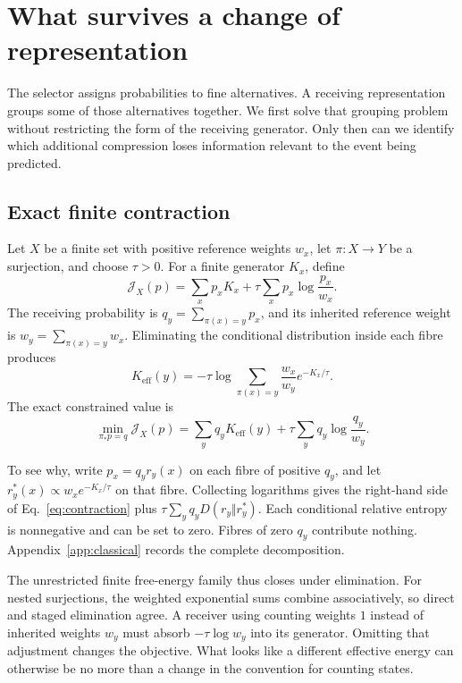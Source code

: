 \section{What survives a change of representation}
\label{sec:yba-examples}

The selector assigns probabilities to fine alternatives. A receiving representation groups some of those alternatives together. We first solve that grouping problem without restricting the form of the receiving generator. Only then can we identify which additional compression loses information relevant to the event being predicted.

\subsection{Exact finite contraction}

Let \(X\) be a finite set with positive reference weights \(w_x\), let \(\pi:X\to Y\) be a surjection, and choose \(\tau>0\). For a finite generator \(K_x\), define
\begin{equation}
 \mathcal J_X(p)=\sum_xp_xK_x+
                    \tau\sum_xp_x\log\frac{p_x}{w_x}.
 \label{eq:fine-free-energy}
\end{equation}
The receiving probability is \(q_y=\sum_{\pi(x)=y}p_x\), and its inherited reference weight is \(w_y=\sum_{\pi(x)=y}w_x\). Eliminating the conditional distribution inside each fibre produces
\begin{equation}
 K_{\mathrm{eff}}(y)=
 -\tau\log\!\sum_{\pi(x)=y}\frac{w_x}{w_y}e^{-K_x/\tau}.
 \label{eq:effective-generator}
\end{equation}
The exact constrained value is
\begin{equation}
 \min_{\pi_*p=q}\mathcal J_X(p)
 =\sum_yq_yK_{\mathrm{eff}}(y)
             +\tau\sum_yq_y\log\frac{q_y}{w_y}.
 \label{eq:contraction}
\end{equation}

To see why, write \(p_x=q_yr_y(x)\) on each fibre of positive \(q_y\), and let
\(r_y^*(x)\propto w_xe^{-K_x/\tau}\) on that fibre. Collecting logarithms gives the right-hand side of Eq.~\eqref{eq:contraction} plus
\(\tau\sum_yq_yD(r_y\Vert r_y^*)\).
Each conditional relative entropy is nonnegative and can be set to zero. Fibres of zero \(q_y\) contribute nothing. Appendix~\ref{app:classical} records the complete decomposition.

The unrestricted finite free-energy family thus closes under elimination. For nested surjections, the weighted exponential sums combine associatively, so direct and staged elimination agree. A receiver using counting weights \(1\) instead of inherited weights \(w_y\) must absorb \(-\tau\log w_y\) into its generator. Omitting that adjustment changes the objective. What looks like a different effective energy can otherwise be no more than a change in the convention for counting states.

